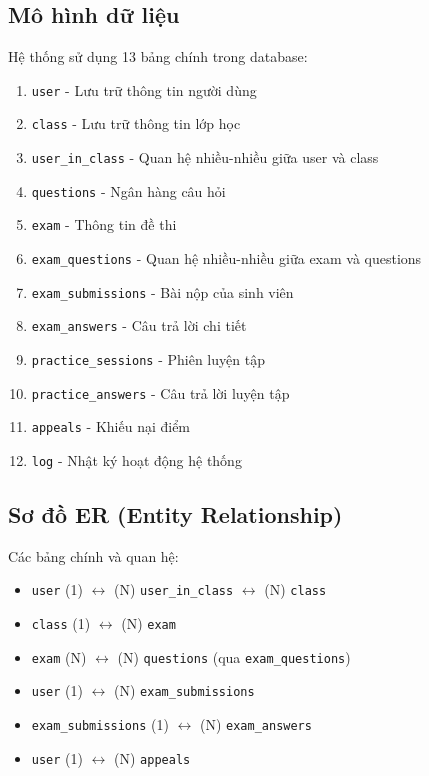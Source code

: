 \documentclass[12pt,a4paper]{report}
\begin{document}
\subsection{Mô hình dữ liệu}

Hệ thống sử dụng 13 bảng chính trong database:

\begin{enumerate}
    \item \texttt{user} - Lưu trữ thông tin người dùng
    \item \texttt{class} - Lưu trữ thông tin lớp học
    \item \texttt{user\_in\_class} - Quan hệ nhiều-nhiều giữa user và class
    \item \texttt{questions} - Ngân hàng câu hỏi
    \item \texttt{exam} - Thông tin đề thi
    \item \texttt{exam\_questions} - Quan hệ nhiều-nhiều giữa exam và questions
    \item \texttt{exam\_submissions} - Bài nộp của sinh viên
    \item \texttt{exam\_answers} - Câu trả lời chi tiết
    \item \texttt{practice\_sessions} - Phiên luyện tập
    \item \texttt{practice\_answers} - Câu trả lời luyện tập
    \item \texttt{appeals} - Khiếu nại điểm
    \item \texttt{log} - Nhật ký hoạt động hệ thống
\end{enumerate}

\subsection{Sơ đồ ER (Entity Relationship)}

Các bảng chính và quan hệ:

\begin{itemize}
    \item \texttt{user} (1) $\leftrightarrow$ (N) \texttt{user\_in\_class} $\leftrightarrow$ (N) \texttt{class}
    \item \texttt{class} (1) $\leftrightarrow$ (N) \texttt{exam}
    \item \texttt{exam} (N) $\leftrightarrow$ (N) \texttt{questions} (qua \texttt{exam\_questions})
    \item \texttt{user} (1) $\leftrightarrow$ (N) \texttt{exam\_submissions}
    \item \texttt{exam\_submissions} (1) $\leftrightarrow$ (N) \texttt{exam\_answers}
    \item \texttt{user} (1) $\leftrightarrow$ (N) \texttt{appeals}
\end{itemize}
\end{document}
